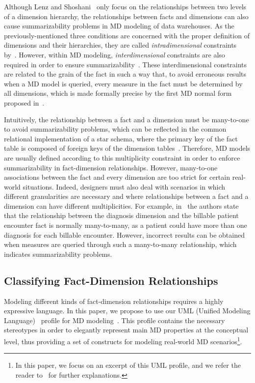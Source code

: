 Although Lenz and Shoshani~\cite{DBLP:conf/ssdbm/LenzS97} only focus
on the relationships between two levels of a dimension hierarchy,
the relationships between facts and dimensions can also cause
summarizability problems in MD modeling of data warehouses. As the
previously-mentioned three conditions are concerned with the proper
definition of dimensions and their hierarchies, they are called
\emph{intradimensional} constraints
by~\cite{DBLP:conf/ssdbm/LehnerAW98}. However, within MD modeling,
\emph{interdimensional} constraints are also required in order to
ensure summarizability~\cite{DBLP:conf/ssdbm/LehnerAW98}. These
interdimensional constraints are related to the grain of the fact in
such a way that, to avoid erroneous results when a MD model is
queried, every measure in the fact must be determined by all
dimensions, which is made formally precise by the first MD normal
form proposed in~\cite{DBLP:journals/is/LechtenborgerV03}.

Intuitively, the relationship between a fact and a dimension must be
many-to-one to avoid summarizability problems, which can be
reflected in the common relational implementation of a star schema,
where the primary key of the fact table is composed of foreign keys
of the dimension tables~\cite{book/Kimball/DW}. Therefore, MD models
are usually defined according to this multiplicity constraint in
order to enforce summarizability in fact-dimension relationships.
However, many-to-one associations between the fact and every
dimension are too strict for certain real-world situations. Indeed,
designers must also deal with scenarios in which different
granularities are necessary and where relationships between a fact
and a dimension can have different multiplicities. For example,
in~\cite{DBLP:conf/dmdw/SongRME01} the authors state that the
relationship between the diagnosis dimension and the billable
patient encounter fact is normally many-to-many, as a patient could
have more than one diagnosis for each billable encounter. However,
incorrect results can be obtained when measures are queried through
such a many-to-many relationship, which indicates summarizability
problems.


\subsection{Classifying Fact-Dimension Relationships}
Modeling different kinds of fact-dimension relationships requires a
highly expressive language. In this paper, we propose to use our UML
(Unified Modeling Language)~\cite{OMG/UML} profile for MD
modeling~\cite{DBLP:journals/dke/Lujan-MoraTS06}. This profile
contains the necessary stereotypes in order to elegantly represent
main MD properties at the conceptual level, thus providing a set of
constructs for modeling real-world MD scenarios\footnote{In this
paper, we focus on an excerpt of this UML profile, and we refer the
reader to~\cite{DBLP:journals/dke/Lujan-MoraTS06} for further
explanations.}.

